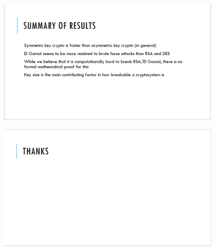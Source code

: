 \documentclass[12pt]{report}
\begin{document}
\begin{figure}[hp!] %
    \begin{center}
        \includegraphics[width=0.85\linewidth]{slide11.PNG}
        \label{fig:slide11}
    \end{center}
\end{figure}

\begin{figure}[hp!] %
    \begin{center}
        \includegraphics[width=0.85\linewidth]{slide12.PNG}
        \label{fig:slide12}
    \end{center}
\end{figure}
\end{document}
